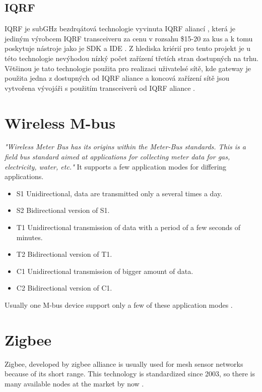 \subsection{IQRF}
IQRF je subGHz bezdrqátová technologie vyvinuta IQRF aliancí \cite{iqrf_alliance}, která je jediným výrobcem IQRF transceiveru \cite{iqrf_transceivers} za cenu v rozsahu \$15-20 za kus a k tomu poskytuje nástroje jako je SDK \cite{iqrf_sdk} a IDE \cite{iqrf_ide}. Z hlediska kriérií pro tento projekt je u této technologie nevýhodou nízký počet zařízení třetích stran dostupných na trhu. 
Většinou je tato technologie použita pro realizaci uživatelsé sítě, kde gateway je použita jedna z dostupných od IQRF aliance a koncová zařízení sítě jsou vytvořena vývojáři s použitím transceiverů od IQRF aliance
\cite{paprer_iqrf}.








\section{Wireless M-bus}
\textit{"Wireless Meter Bus has its origins within the Meter-Bus standards. This is a field bus standard aimed at applications for collecting meter data for gas, electricity, water, etc."} \cite{5}
It supports a few application modes for differing applications.
\begin{itemize}
  \item S1  Unidirectional, data are transmitted only a several times a day.
  \item S2	Bidirectional version of S1.
  \item	T1	Unidirectional transmission of data with a period of a few seconds of minutes.
  \item T2	Bidirectional version of T1.
  \item C1	Unidirectional transmission of bigger amount of data.
  \item C2	Bidirectional version of C1.
\end{itemize}
Usually one M-bus device support only a few of these application modes \cite{5} \cite{6} \cite{7} \cite{8}.


\section{Zigbee}
Zigbee, developed by zigbee alliance is usually used for mesh sensor networks because of its short range. This technology is standardized since 2003, so there is many available nodes at the market by now \cite{10} \cite{11} \cite{12}.

